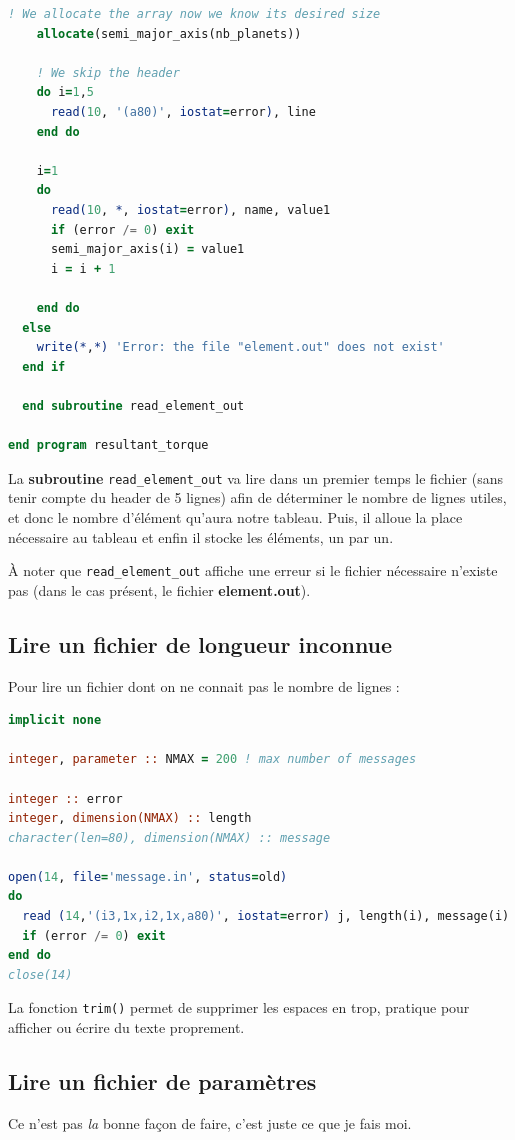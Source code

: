 \documentclass[a4paper,twoside]{article}
\begin{document}
\begin{lstlisting}[language=Fortran]
    ! We allocate the array now we know its desired size
    allocate(semi_major_axis(nb_planets))
    
    ! We skip the header
    do i=1,5
      read(10, '(a80)', iostat=error), line
    end do
    
    i=1
    do
      read(10, *, iostat=error), name, value1
      if (error /= 0) exit
      semi_major_axis(i) = value1
      i = i + 1
    
    end do
  else
    write(*,*) 'Error: the file "element.out" does not exist'
  end if
  
  end subroutine read_element_out

end program resultant_torque
\end{lstlisting}
La \textbf{subroutine} \texttt{read\_element\_out} va lire dans un premier temps le fichier (sans tenir compte du header de 5 lignes) afin de déterminer le nombre de lignes utiles, et donc le nombre d'élément qu'aura notre tableau. Puis, il alloue la place nécessaire au tableau et enfin il stocke les éléments, un par un.

À noter que \texttt{read\_element\_out} affiche une erreur si le fichier nécessaire n'existe pas (dans le cas présent, le fichier \textbf{element.out}).

\subsection{Lire un fichier de longueur inconnue}
Pour lire un fichier dont on ne connait pas le nombre de lignes : 
\begin{lstlisting}[language=Fortran]
implicit none

integer, parameter :: NMAX = 200 ! max number of messages

integer :: error
integer, dimension(NMAX) :: length
character(len=80), dimension(NMAX) :: message

open(14, file='message.in', status=old)
do
  read (14,'(i3,1x,i2,1x,a80)', iostat=error) j, length(i), message(i)
  if (error /= 0) exit
end do
close(14)
\end{lstlisting}

\begin{remarque}
La fonction \texttt{trim()} permet de supprimer les espaces en trop, pratique pour afficher ou écrire du texte proprement.
\end{remarque}

\subsection{Lire un fichier de paramètres}
Ce n'est pas \emph{la} bonne façon de faire, c'est juste ce que je fais moi. 
\end{document}

